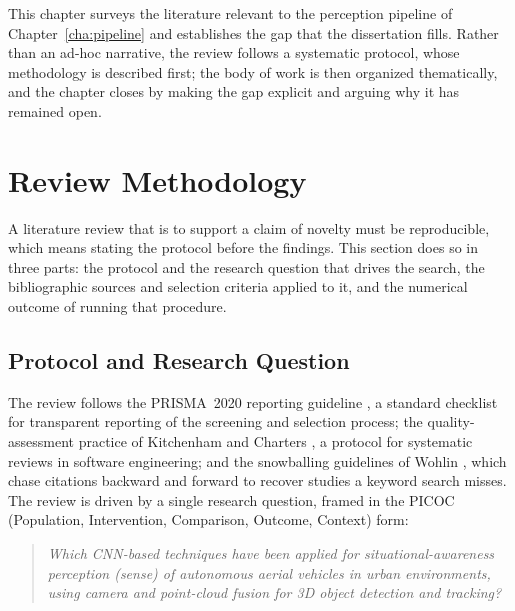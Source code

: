 
This chapter surveys the literature relevant to the perception pipeline of
Chapter~\ref{cha:pipeline} and establishes the gap that the dissertation fills.
Rather than an ad-hoc narrative, the review follows a systematic protocol, whose
methodology is described first; the body of work is then organized thematically,
and the chapter closes by making the gap explicit and arguing why it has remained
open.

\section{Review Methodology}

A literature review that is to support a claim of novelty must be reproducible,
which means stating the protocol before the findings. This section does so in
three parts: the protocol and the research question that drives the search, the
bibliographic sources and selection criteria applied to it, and the numerical
outcome of running that procedure.

\subsection{Protocol and Research Question}

The review follows the PRISMA~2020 reporting guideline \cite{page2021prisma}, a
standard checklist for transparent reporting of the screening and selection
process; the quality-assessment practice of Kitchenham and Charters
\cite{kitchenham2007slr}, a protocol for systematic reviews in software
engineering; and the snowballing guidelines of Wohlin \cite{wohlin2014snowball},
which chase citations backward and forward to recover studies a keyword search
misses. The review is driven by a single research question, framed in
the PICOC (Population, Intervention, Comparison, Outcome, Context) form:

\begin{quote}
\emph{Which CNN-based techniques have been applied for situational-awareness
perception (sense) of autonomous aerial vehicles in urban environments, using
camera and point-cloud fusion for 3D object detection and tracking?}
\end{quote}


